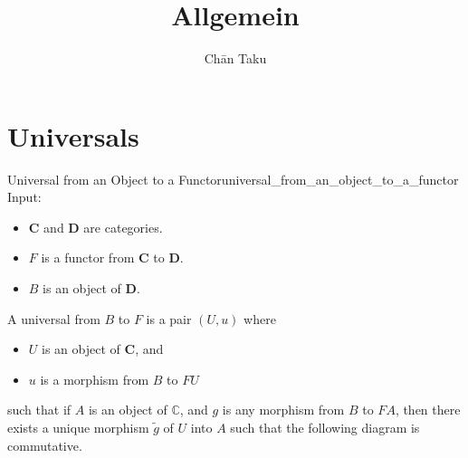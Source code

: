 \documentclass{article}
\title{Allgemein}
\author{Ch\=an Taku}
\begin{document}
\maketitle

\section{Universals}

\begin{definition}{Universal from an Object to a Functor}{universal_from_an_object_to_a_functor}
    Input:
    \begin{itemize}
        \item $\mathbf{C}$ and $\mathbf{D}$ are categories.
        \item $F$ is a functor from $\mathbf{C}$ to $\mathbf{D}$.
        \item $B$ is an object of $\mathbf{D}$.
    \end{itemize}
    A universal from $B$ to $F$ is a pair $(U,u)$ where
    \begin{itemize}
        \item $U$ is an object of $\mathbf{C}$, and
        \item $u$ is a morphism from $B$ to $FU$
    \end{itemize}
    such that if $A$ is an object of $\mathbb{C}$,
    and $g$ is any morphism from $B$ to $FA$,
    then there exists a unique morphism $\tilde{g}$ of $U$ into $A$
    such that the following diagram is commutative.
    \begin{center}
    \end{center}
\end{definition}
\end{document}
